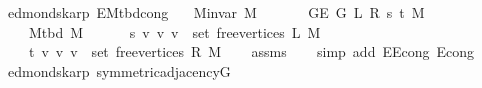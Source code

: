 \begin{isabellebody}
\endisatagproof
{\isafoldproof}%
%
\isadelimproof
\isanewline
%
\endisadelimproof
%
\isadeliminvisible
\isanewline
%
\endisadeliminvisible
%
\isataginvisible
{}\isamarkupfalse%
\ {\isacharparenleft}{\kern0pt}\ edmonds{\isacharunderscore}{\kern0pt}karp{\isacharparenright}{\kern0pt}\ E{}{\isacharunderscore}{\kern0pt}{}{\isacharunderscore}{\kern0pt}M{\isacharunderscore}{\kern0pt}tbd{\isacharunderscore}{\kern0pt}cong{\isacharcolon}{\kern0pt}\isanewline
\ \ \ {\isachardoublequoteopen}M{\isachardot}{\kern0pt}invar\ M{\isachardoublequoteclose}\isanewline
\ \ \isanewline
\ \ \ \ {\isachardoublequoteopen}G{\isachardot}{\kern0pt}E\ {\isacharparenleft}{\kern0pt}G{}{\isacharunderscore}{\kern0pt}{}\ L\ R\ s\ t\ M{\isacharparenright}{\kern0pt}\ {\isacharequal}{\kern0pt}\isanewline
\ \ \ \ \ M{\isacharunderscore}{\kern0pt}tbd\ M\ {\isasymunion}\isanewline
\ \ \ \ \ {\isacharbraceleft}{\kern0pt}{\isacharbraceleft}{\kern0pt}s{\isacharcomma}{\kern0pt}\ v{\isacharbraceright}{\kern0pt}\ {\isacharbar}{\kern0pt}v{\isachardot}{\kern0pt}\ v\ {\isasymin}\ set\ {\isacharparenleft}{\kern0pt}free{\isacharunderscore}{\kern0pt}vertices\ L\ M{\isacharparenright}{\kern0pt}{\isacharbraceright}{\kern0pt}\ {\isasymunion}\isanewline
\ \ \ \ \ {\isacharbraceleft}{\kern0pt}{\isacharbraceleft}{\kern0pt}t{\isacharcomma}{\kern0pt}\ v{\isacharbraceright}{\kern0pt}\ {\isacharbar}{\kern0pt}v{\isachardot}{\kern0pt}\ v\ {\isasymin}\ set\ {\isacharparenleft}{\kern0pt}free{\isacharunderscore}{\kern0pt}vertices\ R\ M{\isacharparenright}{\kern0pt}{\isacharbraceright}{\kern0pt}{\isachardoublequoteclose}%
\endisataginvisible
{\isafoldinvisible}%
%
\isadeliminvisible
\isanewline
%
\endisadeliminvisible
%
\isadelimproof
\ \ %
\endisadelimproof
%
\isatagproof
{}\isamarkupfalse%
\ assms\isanewline
\ \ \isamarkupfalse%
\ {\isacharparenleft}{\kern0pt}simp\ add{\isacharcolon}{\kern0pt}\ E{}{\isacharunderscore}{\kern0pt}{}{\isacharunderscore}{\kern0pt}E{}{\isacharunderscore}{\kern0pt}{}{\isacharunderscore}{\kern0pt}cong\ E{}{\isacharunderscore}{\kern0pt}{}{\isacharunderscore}{\kern0pt}cong{\isacharparenright}{\kern0pt}%
\endisatagproof
{\isafoldproof}%
%
\isadelimproof
\isanewline
%
\endisadelimproof
%
\isadeliminvisible
\isanewline
%
\endisadeliminvisible
%
\isataginvisible
{}\isamarkupfalse%
\ {\isacharparenleft}{\kern0pt}\ edmonds{\isacharunderscore}{\kern0pt}karp{\isacharparenright}{\kern0pt}\ symmetric{\isacharunderscore}{\kern0pt}adjacency{\isacharunderscore}{\kern0pt}G{}{\isacharunderscore}{\kern0pt}{}{\isacharcolon}{\kern0pt}\isanewline

\end{isabellebody}
